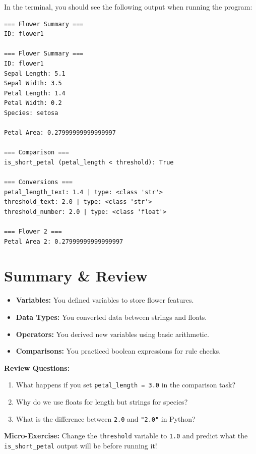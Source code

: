 In the terminal, you should see the following output when running the program:
\begin{verbatim}
=== Flower Summary ===
ID: flower1

=== Flower Summary ===
ID: flower1
Sepal Length: 5.1
Sepal Width: 3.5
Petal Length: 1.4
Petal Width: 0.2
Species: setosa

Petal Area: 0.27999999999999997

=== Comparison ===
is_short_petal (petal_length < threshold): True

=== Conversions ===
petal_length_text: 1.4 | type: <class 'str'>
threshold_text: 2.0 | type: <class 'str'>
threshold_number: 2.0 | type: <class 'float'>

=== Flower 2 ===
Petal Area 2: 0.27999999999999997
\end{verbatim}


\section{Summary \& Review}
\begin{itemize}
    \item \textbf{Variables:} You defined variables to store flower features.
    \item \textbf{Data Types:} You converted data between strings and floats.
    \item \textbf{Operators:} You derived new variables using basic arithmetic.
    \item \textbf{Comparisons:} You practiced boolean expressions for rule checks.
\end{itemize}

\textbf{Review Questions:}
\begin{enumerate}
    \item What happens if you set \texttt{petal\_length = 3.0} in the comparison task?
    \item Why do we use floats for length but strings for species?
    \item What is the difference between \texttt{2.0} and \texttt{"2.0"} in Python?
\end{enumerate}

\textbf{Micro-Exercise:} Change the \texttt{threshold} variable to \texttt{1.0} and predict what the \texttt{is\_short\_petal} output will be before running it!

